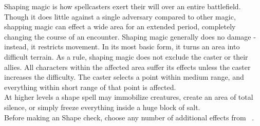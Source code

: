 Shaping magic is how spellcasters exert their will over an entire battlefield.
Though it does little against a single adversary compared to other magic, shapping
magic can effect a wide area for an extended period, completely changing the course
of an encounter. Shaping magic generally does no damage - instead, it restricts
movement. In its most basic form, it turns an area into difficult terrain. As a
rule, shaping magic does not exclude the caster or their allies. All characters
within the affected area suffer its effects unless the caster increases the
difficulty. The caster selects a point within medium range, and everything within
short range of that point is affected.\\

At higher levels a shape spell may immobilize creatures, create an area of total
silence, or simply freeze everything inside a huge block of salt.\\
Before making an Shape check, choose any number of additional
effects from ~.
